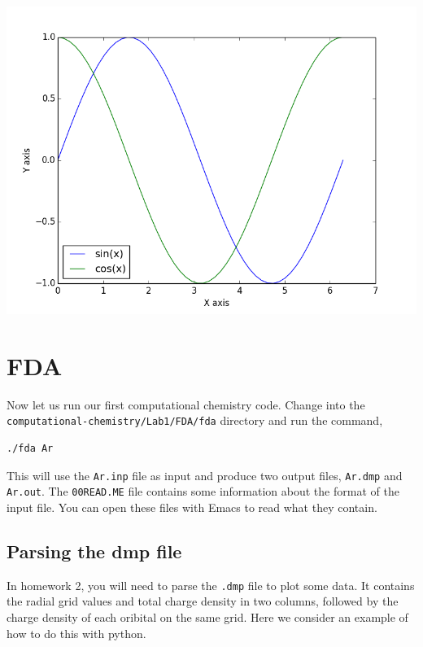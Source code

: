 \documentclass[11pt]{article}
\begin{document}
\includegraphics[width=.9\linewidth]{./images/Lab1.png}


\section{FDA}
\label{sec-4}

Now let us run our first computational chemistry code. Change into the \verb~computational-chemistry/Lab1/FDA/fda~ directory and run the command,

\begin{verbatim}
./fda Ar
\end{verbatim}

This will use the \texttt{Ar.inp} file as input and produce two output files, \texttt{Ar.dmp} and \texttt{Ar.out}. The \texttt{00READ.ME} file contains some information about the format of the input file. You can open these files with Emacs to read what they contain.

\subsection{Parsing the dmp file}
\label{sec-4-1}

In homework 2, you will need to parse the \texttt{.dmp} file to plot some data. It contains the radial grid values and total charge density in two columns, followed by the charge density of each oribital on the same grid. Here we consider an example of how to do this with python.
\end{document}
